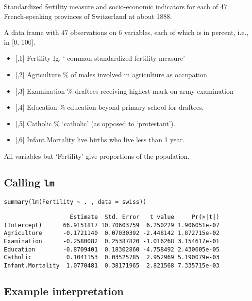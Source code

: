 \documentclass[12pt,openright,oneside,a4paper,chapter=TITLE,section=TITLE,subsection=Title,english,french,spanish,portugues,sumario=tradicional]{04-class-files/abntex2}
\providecommand{\tightlist}{%
  \setlength{\itemsep}{0pt}\setlength{\parskip}{0pt}}
\begin{document}
Standardized fertility measure and socio-economic indicators for each of 47 French-speaking provinces of Switzerland at about 1888.

A data frame with 47 observations on 6 variables, each of which is in percent, i.e., in {[}0, 100{]}.

\begin{itemize}
\tightlist
\item
  {[},1{]} Fertility Ig, ` common standardized fertility measure'
\item
  {[},2{]} Agriculture \% of males involved in agriculture as occupation
\item
  {[},3{]} Examination \% draftees receiving highest mark on army examination
\item
  {[},4{]} Education \% education beyond primary school for draftees.
\item
  {[},5{]} Catholic \% `catholic' (as opposed to `protestant').
\item
  {[},6{]} Infant.Mortality live births who live less than 1 year.
\end{itemize}

All variables but `Fertility' give proportions of the population.

\hypertarget{calling-lm}{%
\subsection{\texorpdfstring{Calling \texttt{lm}}{Calling lm}}\label{calling-lm}}

\texttt{summary(lm(Fertility\ \textasciitilde{}\ .\ ,\ data\ =\ swiss))}

\begin{verbatim}
                   Estimate  Std. Error   t value     Pr(>|t|)
(Intercept)      66.9151817 10.70603759  6.250229 1.906051e-07
Agriculture      -0.1721140  0.07030392 -2.448142 1.872715e-02
Examination      -0.2580082  0.25387820 -1.016268 3.154617e-01
Education        -0.8709401  0.18302860 -4.758492 2.430605e-05
Catholic          0.1041153  0.03525785  2.952969 5.190079e-03
Infant.Mortality  1.0770481  0.38171965  2.821568 7.335715e-03
\end{verbatim}

\hypertarget{example-interpretation}{%
\subsection{Example interpretation}\label{example-interpretation}}
\end{document}

